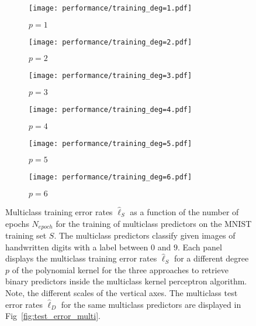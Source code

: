 \begin{figure}[h!]
    \begin{subfigure}[t]{0.49\textwidth}
        \centering
        \texttt{[image: performance/training\_deg=1.pdf]} 
        \caption{$p = 1$}
    \end{subfigure}
    \hfill
    \begin{subfigure}[t]{0.49\textwidth}
        \centering
        \texttt{[image: performance/training\_deg=2.pdf]} 
        \caption{$p = 2$}
    \end{subfigure}
    \par\bigskip
        \begin{subfigure}[t]{0.49\textwidth}
        \centering
        \texttt{[image: performance/training\_deg=3.pdf]} 
        \caption{$p = 3$}
    \end{subfigure}
    \hfill
    \begin{subfigure}[t]{0.49\textwidth}
        \centering
        \texttt{[image: performance/training\_deg=4.pdf]} 
        \caption{$p = 4$}
    \end{subfigure}
    \par\bigskip
        \begin{subfigure}[t]{0.49\textwidth}
        \centering
        \texttt{[image: performance/training\_deg=5.pdf]} 
        \caption{$p = 5$}
    \end{subfigure}
    \hfill
    \begin{subfigure}[t]{0.49\textwidth}
        \centering
        \texttt{[image: performance/training\_deg=6.pdf]} 
        \caption{$p = 6$}
    \end{subfigure}
    \caption{Multiclass training error rates $\hat{\ell}_{S}$ as a function of the number of epochs $N_{epoch}$ for the training of multiclass predictors on the MNIST training set $S$. The multiclass predictors classify given images of handwritten digits with a label between $0$ and $9$. Each panel displays the multiclass training error rates $\hat{\ell}_{S}$ for a different degree $p$ of the polynomial kernel for the three approaches to retrieve binary predictors inside the multiclass kernel perceptron algorithm. Note, the different scales of the vertical axes. The multiclass test error rates $\hat{\ell}_{D}$ for the same multiclass predictors are displayed in Fig~\ref{fig:test_error_multi}.}
    \label{fig:train_error_multi}
\end{figure}

